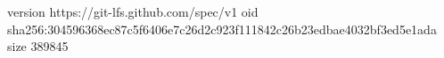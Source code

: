 version https://git-lfs.github.com/spec/v1
oid sha256:304596368ec87c5f6406e7c26d2c923f111842c26b23edbae4032bf3ed5e1ada
size 389845
